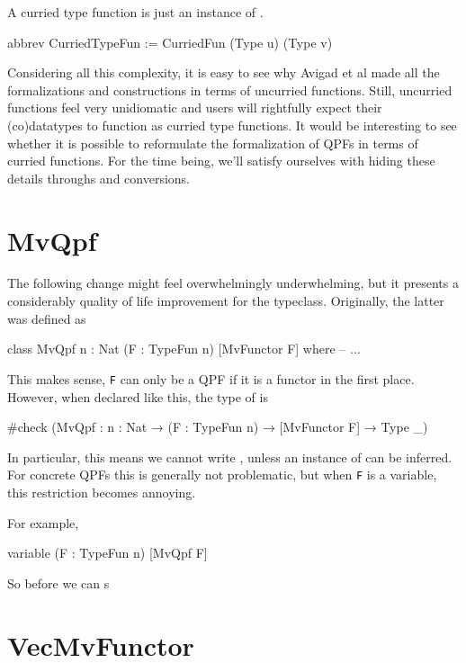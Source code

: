 \documentclass[titlepage]{report}
\begin{document}
A curried type function is just an instance of .
\begin{leancode}
    abbrev CurriedTypeFun := CurriedFun (Type u) (Type v)
\end{leancode}



Considering all this complexity, it is easy to see why Avigad et al made all the formalizations and
constructions in terms of uncurried functions. 
Still, uncurried functions feel very unidiomatic and users will rightfully expect their (co)datatypes
to function as curried type functions. 
It would be interesting to see whether it is possible to reformulate the formalization of QPFs in
terms of curried functions. 
For the time being, we'll satisfy ourselves with hiding these details throughs
 and  conversions.



\section{MvQpf}
The following change might feel overwhelmingly underwhelming, but it presents a considerably quality 
of life improvement for the  typeclass. Originally, the latter was defined as
\begin{leancode}
    class MvQpf {n : Nat} (F : TypeFun n) [MvFunctor F] where
        -- ...
\end{leancode}
This makes sense, \texttt{F} can only be a QPF if it is a functor in the first place.
However, when declared like this, the type of  is 
\begin{leancode}
    #check (MvQpf : {n : Nat} → (F : TypeFun n) → [MvFunctor F] → Type _)
\end{leancode}
In particular, this means we cannot write , unless an instance of 
can be inferred. For concrete QPFs this is generally not problematic, but when \texttt{F} is a
variable, this restriction becomes annoying. 

For example, 
\begin{leancode}
    variable (F : TypeFun n) [MvQpf F]
\end{leancode}

So before we can s



\section{VecMvFunctor}
\end{document}
